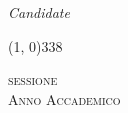 \documentclass[../thesis.tex]{subfiles}
\begin{document}
\begin{titlepage}
\begin{center}
\begin{large}
                \begin{flushright}
                    \textit{Candidate}\\
                    \vspace{1pt}
                    \myName
                \end{flushright}
            \end{large}

            \vfill

            \line(1, 0){338} \\
            
            \begin{normalsize}
                \textsc{sessione~\mySession}\\
                \textsc{Anno Accademico \myAY}
            \end{normalsize}

        \end{center}
    \end{titlepage}
\end{document}
